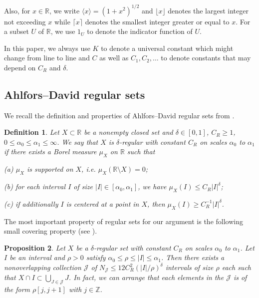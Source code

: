 \documentclass[reqno,12pt,letterpaper]{amsart}
\newtheorem{prop}{Proposition}
\newtheorem{defi}[prop]{Definition}
\numberwithin{equation}{section}
\numberwithin{prop}{section}
\begin{document}
Also, for $x\in\mathbb{R}$, we write $\langle x\rangle=(1+x^2)^{1/2}$
and $\lfloor x\rfloor$ denotes the largest integer not exceeding $x$ while $\lceil x\rceil$ denotes the smallest integer greater or equal to $x$. For a subset $U$ of $\mathbb{R}$, we use $1_U$ to denote the indicator function of $U$.

In this paper, we always use $K$ to denote a universal constant which might change from line to line and $C$ as well as $C_1,C_2,\ldots$ to denote constants that may depend on $C_R$ and $\delta$.


\subsection{Ahlfors--David regular sets}
\label{s:regular}

We recall the definition and properties of Ahlfors--David regular sets from \cite{fullgap}.
\begin{defi}
Let $X\subset\mathbb{R}$ be a nonempty closed set and $\delta\in[0,1]$, $C_R\geq1$, $0\leq\alpha_0\leq\alpha_1\leq\infty$. We say that $X$ is $\delta$-regular with constant $C_R$ on scales $\alpha_0$ to $\alpha_1$ if there exists a Borel measure $\mu_X$ on $\mathbb{R}$ such that 

(a) $\mu_X$ is supported on $X$, i.e. $\mu_X(\mathbb{R}\setminus X)=0$; 

(b) for each interval $I$ of size $|I|\in[\alpha_0,\alpha_1]$, we have $\mu_X(I)\leq C_R|I|^\delta$; 

(c) if additionally $I$ is centered at a point in $X$, then $\mu_X(I)\geq C_R^{-1}|I|^\delta$.
\end{defi}

The most important property of regular sets for our argument is the following small covering property (see \cite[Lemma 2.8]{fullgap}).

\begin{prop}
\label{p:smallcover}
Let $X$ be a $\delta$-regular set with constant $C_R$ on scales $\alpha_0$ to $\alpha_1$. Let $I$ be an interval and $\rho>0$ satisfy $\alpha_0\leq\rho\leq|I|\leq\alpha_1$. Then there exists a nonoverlapping collection $\mathcal{J}$ of $N_\mathcal{J}\leq 12C_R^2(|I|/\rho)^{\delta}$ intervals of size $\rho$ each such that $X\cap I\subset\bigcup_{J\in\mathcal{J}}J$. In fact, we can arrange that each elements in the $\mathcal{J}$ is of the form $\rho[j,j+1]$ with $j\in\mathbb{Z}$.
\end{prop}
\end{document}
